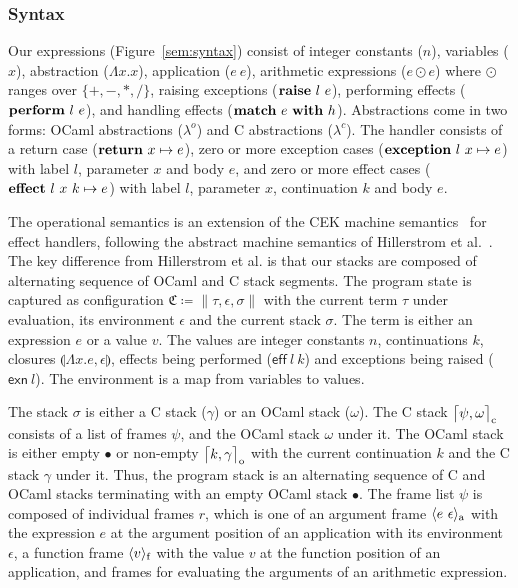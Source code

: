 \documentclass[sigplan,screen]{acmart}
\newcommand{\lam}[2]{\Lambda #1. #2}
\newcommand{\env}{\epsilon}
\newcommand{\clos}[3]{\llparenthesis \lam{#1}{#2}, #3 \rrparenthesis}
\newcommand{\kw}[1]{\text{\bf #1}}
\newcommand{\effval}[2]{\textsf{eff} ~#1 ~#2}
\newcommand{\exnval}[1]{\textsf{exn} ~#1}
\newcommand{\handle}[2]{\kw{match} ~#1 ~\kw{with} ~#2}
\newcommand{\throw}[2]{\kw{raise} ~#1 ~#2}
\newcommand{\perform}[2]{\kw{perform} ~#1 ~#2}
\newcommand{\caseval}[2]{\kw{return}~#1 \mapsto #2}
\newcommand{\caseexn}[3]{\kw{exception} ~#1 ~#2 \mapsto #3}
\newcommand{\caseeff}[4]{\kw{effect} ~#1 ~#2 ~#3 \mapsto #4}
\newcommand{\farg}[2]{\langle #1 ~#2 \rangle_{\text a}}
\newcommand{\ffun}[1]{\langle #1 \rangle_{\text f}}
\newcommand{\fl}{\psi} %
\newcommand{\cstack}{\gamma} %
\newcommand{\ostack}{\omega} %
\newcommand{\cstacka}[2]{\big \lceil #1, #2 \big \rceil_{\text c}} %
\newcommand{\ostacka}[2]{\big \lceil #1, #2 \big \rceil_{\text o}} %
\newcommand{\ostackemp}{\bullet}
\newcommand{\stack}{\sigma}
\newcommand{\config}{\mathfrak{C}}
\newcommand{\configa}[3]{\|#1,#2,#3\|}
\begin{document}
\subsubsection{Syntax} Our expressions (Figure~\ref{sem:syntax}) consist of
integer constants ($n$), variables ($x$), abstraction ($\lam{x}{x}$),
application ($e~e$), arithmetic expressions ($e \odot e$) where $\odot$ ranges
over $\{+,-,*,/\}$, raising exceptions ($\throw{l}{e}$), performing effects
($\perform{l}{e}$), and handling effects ($\handle{e}{h}$). Abstractions come
in two forms: OCaml abstractions ($\lambda^o$) and C abstractions
($\lambda^c$). The handler consists of a return case ($\caseval{x}{e}$), zero
or more exception cases ($\caseexn{l}{x}{e}$) with label $l$, parameter $x$ and
body $e$, and zero or more effect cases ($\caseeff{l}{x}{k}{e}$) with label
$l$, parameter $x$, continuation $k$ and body $e$.

The operational semantics is an extension of the CEK machine
semantics~\cite{Felleisen86} for effect handlers, following the abstract
machine semantics of Hillerstrom et al.~\cite{Hillerstrom20}. The key
difference from Hillerstrom et al. is that our stacks are composed of
alternating sequence of OCaml and C stack segments. The program state is
captured as configuration $\config \coloneqq \configa{\tau}{\env}{\stack}$ with
the current term $\tau$ under evaluation, its environment $\env$ and the
current stack $\stack$. The term is either an expression $e$ or a value $v$.
The values are integer constants $n$, continuations $k$, closures
$\clos{x}{e}{\env}$, effects being performed ($\effval{l}{k}$) and exceptions
being raised ($\exnval{l}$). The environment is a map from variables to values.

The stack $\stack$ is either a C stack ($\cstack$) or an OCaml stack
($\ostack$). The C stack $\cstacka{\fl}{\ostack}$ consists of a list of
frames $\fl$, and the OCaml stack $\ostack$ under it. The OCaml stack is
either empty $\ostackemp$ or non-empty $\ostacka{k}{\cstack}$ with the current
continuation $k$ and the C stack $\cstack$ under it. Thus, the program stack is
an alternating sequence of C and OCaml stacks terminating with an empty OCaml
stack $\ostackemp$. The frame list $\fl$ is composed of individual frames $r$,
which is one of an argument frame $\farg{e}{\env}$ with the expression $e$ at
the argument position of an application with its environment $\env$, a function
frame $\ffun{v}$ with the value $v$ at the function position of an application,
and frames for evaluating the arguments of an arithmetic expression.
\end{document}
